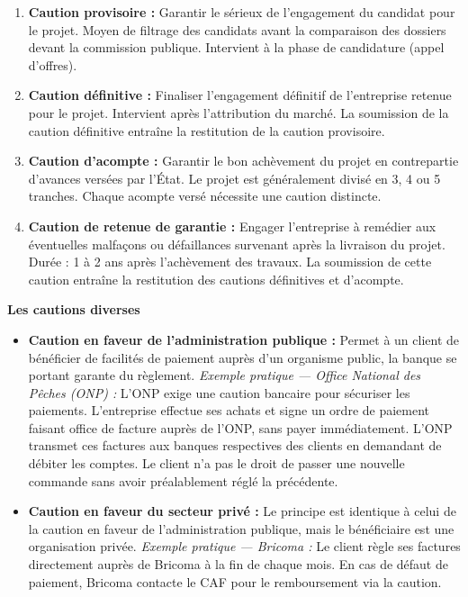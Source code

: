 \begin{enumerate}
  \item \textbf{Caution provisoire :} Garantir le sérieux de l'engagement du candidat pour le projet. Moyen de filtrage des candidats avant la comparaison des dossiers devant la commission publique. Intervient à la phase de candidature (appel d'offres).

  \item \textbf{Caution définitive :} Finaliser l'engagement définitif de l'entreprise retenue pour le projet. Intervient après l'attribution du marché. La soumission de la caution définitive entraîne la restitution de la caution provisoire.

  \item \textbf{Caution d'acompte :} Garantir le bon achèvement du projet en contrepartie d'avances versées par l'État. Le projet est généralement divisé en 3, 4 ou 5 tranches. Chaque acompte versé nécessite une caution distincte.

  \item \textbf{Caution de retenue de garantie :} Engager l'entreprise à remédier aux éventuelles malfaçons ou défaillances survenant après la livraison du projet. Durée : 1 à 2 ans après l'achèvement des travaux. La soumission de cette caution entraîne la restitution des cautions définitives et d'acompte.
\end{enumerate}

\medskip\textbf{Les cautions diverses}

\begin{itemize}
  \item \textbf{Caution en faveur de l'administration publique :} Permet à un client de bénéficier de facilités de paiement auprès d'un organisme public, la banque se portant garante du règlement. \textit{Exemple pratique --- Office National des Pêches (ONP) :} L'ONP exige une caution bancaire pour sécuriser les paiements. L'entreprise effectue ses achats et signe un ordre de paiement faisant office de facture auprès de l'ONP, sans payer immédiatement. L'ONP transmet ces factures aux banques respectives des clients en demandant de débiter les comptes. Le client n'a pas le droit de passer une nouvelle commande sans avoir préalablement réglé la précédente.

  \item \textbf{Caution en faveur du secteur privé :} Le principe est identique à celui de la caution en faveur de l'administration publique, mais le bénéficiaire est une organisation privée. \textit{Exemple pratique --- Bricoma :} Le client règle ses factures directement auprès de Bricoma à la fin de chaque mois. En cas de défaut de paiement, Bricoma contacte le CAF pour le remboursement via la caution.
\end{itemize}

